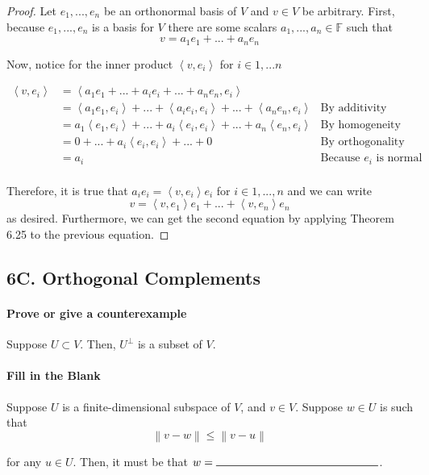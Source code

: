 \documentclass{article}
\newcommand{\norm}[1]{\left\lVert#1\right\rVert}
\newcommand{\iprod}[2]{\left\langle#1,#2\right\rangle}
\newcommand{\blank}[1]{\rule[0ex]{#1in}{0.5pt}}
\begin{document}
\begin{proof}
    Let $e_1, ..., e_n$ be an orthonormal basis of $V$ and $v \in V$ be arbitrary. First, because $e_1, ..., e_n$ is a basis for $V$ there are some scalars $a_1, ..., a_n \in \mathbb{F}$ such that
    \[
        v = a_1e_1 + ... + a_ne_n 
    \]
    
    Now, notice for the inner product $\iprod{v}{e_i}$ for $i \in 1, ... n$
    
    \[\begin{aligned}
        \iprod{v}{e_i}
        &= \iprod{a_1e_1 + ... + a_ie_i + ... + a_ne_n}{e_i} \\
        &= \iprod{a_1e_1}{e_i} + ... + \iprod{a_ie_i}{e_i} + ... + \iprod{a_ne_n}{e_i} &\text{By additivity} \\
        &= a_1\iprod{e_1}{e_i} + ... + a_i\iprod{e_i}{e_i} + ... + a_n\iprod{e_n}{e_i} &\text{By homogeneity in the first slot} \\
        &= 0 + ... + a_i\iprod{e_i}{e_i} + ... + 0 &\text{By orthogonality} \\
        &= a_i &\text{Because $e_i$ is normal} \\
    \end{aligned}\]
    
    Therefore, it is true that $a_ie_i = \iprod{v}{e_i}{e_i}$ for $i \in 1, ..., n$ and we can write
    \[ v = \iprod{v}{e_1}e_1 + ... + \iprod{v}{e_n}e_n \]
    as desired. Furthermore, we can get the second equation by applying Theorem 6.25 to the previous equation.
\end{proof}

\subsection*{6C. Orthogonal Complements}
\paragraph{Prove or give a counterexample} Suppose $U \subset V$. Then, $U^\perp$ is a subset of $V$.

\paragraph{Fill in the Blank} Suppose $U$ is a finite-dimensional subspace of $V$, and $v \in V$. Suppose $w \in U$ is such that
\[ \norm{v - w} \leq \norm{v - u} \]

for any $u \in U$. Then, it must be that $w = \blank{2}$.
\end{document}
